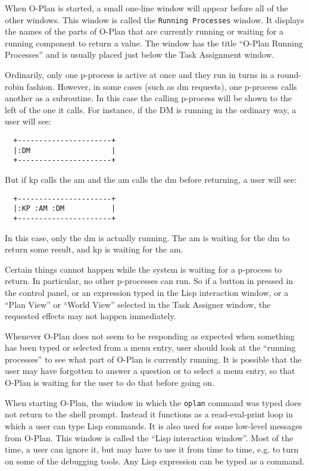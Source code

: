When O-Plan is started, a small one-line window will appear before
all of the other windows.  This window is called the {\tt Running
Processes} window.  It displays the names of the parts of O-Plan that
are currently running or waiting for a running component to return a
value.  The window has the title ``O-Plan Running Processes'' and is
usually placed just below the Task Assignment window.

Ordinarily, only one p-process is active at once and they run
in turns in a round-robin fashion.  However, in some cases (such
as {\sc dm} requests), one p-process calls another as a subroutine.
In this case the calling p-process will be shown to the left of
the one it calls.  For instance, if the DM is running in the
ordinary way, a user will see:

\begin{verbatim} 
  +----------------------+
  |:DM                   |
  +----------------------+
\end{verbatim}

But if {\sc kp} calls the {\sc am} and the {\sc am} calls the {\sc dm}
before returning, a user will see:

\begin{verbatim} 
  +----------------------+
  |:KP :AM :DM           |
  +----------------------+
\end{verbatim}

In this case, only the {\sc dm} is actually running.  The {\sc am} is
waiting for the {\sc dm} to return some result, and {\sc kp} is
waiting for the {\sc am}.

Certain things cannot happen while the system is waiting for a
p-process to return.  In particular, no other p-processes can run.  So
if a button in pressed in the control panel, or an expression typed in
the Lisp interaction window, or a ``Plan View'' or ``World View'' selected
in the Task Assigner window, the requested effects may not happen
immediately.

Whenever O-Plan does not seem to be responding as expected when
something has been typed or selected from a menu entry, user should
look at the ``running processes'' to see what part of O-Plan is
currently running.  It is possible that the user may have forgotten to
answer a question or to select a menu entry, so that O-Plan is
waiting for the user to do that before going on.

When starting O-Plan, the window in which the {\tt oplan} command
was typed does not return to the shell prompt.  Instead it functions
as a read-eval-print loop in which a user can type Lisp commands.  It
is also used for some low-level messages from O-Plan.  This window is
called the ``Lisp interaction window''.  Most of the time, a user can
ignore it, but may have to use it from time to time, e.g. to turn
on some of the debugging tools.  Any Lisp expression can be typed as a
command.

